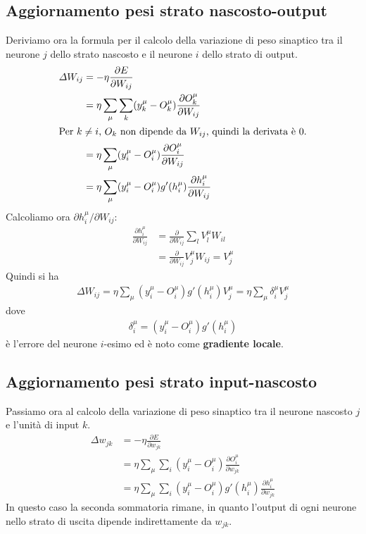 \subsection{Aggiornamento pesi strato nascosto-output}
\label{sub:aggiornamento_pesi_strato_nascosto_output}

Deriviamo ora la formula per il calcolo della variazione di peso sinaptico tra il neurone $j$ dello strato nascosto e il neurone $i$ dello strato di output.
\begin{align*}
	\Delta W_{ij} &= - \eta \frac{\partial E}{\partial W_{ij}} \\
	&= \eta \sum_\mu \sum_k (y_k^\mu -O_k^\mu) \frac{\partial O_k^\mu}{\partial W_{ij}} \\
	\intertext{Per $k\neq i$, $O_k$ non dipende da $W_{ij}$, quindi la derivata è 0.}
	&= \eta \sum_\mu (y_i^\mu - O_i^\mu) \frac{\partial O_i^\mu}{\partial W_{ij}} \\
	&= \eta \sum_\mu (y_i^\mu - O_i^\mu) g'(h_i^\mu) \frac{\partial h_i^\mu}{\partial{W_{ij}}}
\end{align*}
Calcoliamo ora $\partial h_i^\mu / \partial W_{ij}$:
\begin{align*}
	\frac{\partial h_i^\mu}{\partial{W_{ij}}} &= \frac{\partial}{\partial{W_{ij}}} \sum_l V_l^\mu W_{il} \\
	&= \frac{\partial}{\partial{W_{ij}}} V_j^\mu W_{ij} = V_j^\mu
\end{align*}
Quindi si ha
\begin{align*}
	\Delta W_{ij} = \eta \sum_\mu (y_i^\mu - O_i^\mu) g'(h_i^\mu) V_j^\mu = \eta \sum_\mu \delta^\mu_i V^\mu_j
\end{align*}
dove
\begin{align*}
	\delta^\mu_i = (y^\mu_i - O^\mu_i) g'(h^\mu_i)
\end{align*}
è l'errore del neurone $i$-esimo ed è noto come \textbf{gradiente locale}.

\subsection{Aggiornamento pesi strato input-nascosto}\label{sub:aggiornamento_pesi_strato_input_nascosto}

Passiamo ora al calcolo della variazione di peso sinaptico tra il neurone nascosto $j$ e l'unità di input $k$.
\begin{align*}
	\Delta w_{jk} &= - \eta \frac{\partial E}{\partial w_{jk}} \\
	&= \eta \sum_\mu \sum_i (y^\mu_i - O^\mu_i) \frac{\partial O^\mu_i}{\partial w_{jk}} \\
	&= \eta \sum_\mu \sum_i (y^\mu_i - O^\mu_i) g'(h^\mu_i) \frac{\partial h^\mu_i}{\partial w_{jk}}
\end{align*}
In questo caso la seconda sommatoria rimane, in quanto l'output di ogni neurone nello strato di uscita dipende indirettamente da $w_{jk}$.

